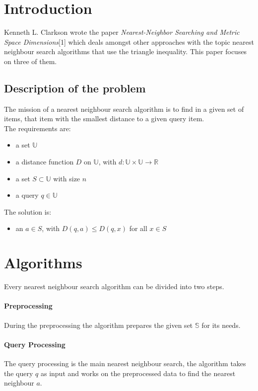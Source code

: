 \documentclass[runningheads,a4paper]{llncs}
\begin{document}
\tableofcontents
{}

\newpage
{}

\section{Introduction}

Kenneth L. Clarkson wrote the paper \textit{Nearest-Neighbor Searching and Metric Space Dimensions}[1] which deals
amongst other approaches with the topic nearest neighbour search algorithms that use the triangle inequality. This paper
focuses on three of them.

\subsection{Description of the problem}

The mission of a nearest neighbour search algorithm is to find in a given set of items, that item with the smallest
distance to a given query item.\\
The requirements are:
\begin{itemize}
	\item a set $\mathbb{U}$
	\item a distance function $D$ on $\mathbb{U}$, with $d: \mathbb{U} \times \mathbb{U} \to \mathbb{R}$
	\item a set $S \subset \mathbb{U}$ with size $n$
	\item a query $q \in \mathbb{U}$
\end{itemize}
The solution is:
\begin{itemize}
	\item an $a \in S$, with $D(q, a) \le D(q, x)$ for all $x \in S$
\end{itemize}

\section{Algorithms}

Every nearest neighbour search algorithm can be divided into two steps.
\paragraph{Preprocessing}
During the preprocessing the algorithm prepares the given set $\mathbb{S}$ for its needs.

\paragraph{Query Processing}
The query processing is the main nearest neighbour search, the algorithm takes the query $q$ as input and works on the
preprocessed data to find the nearest neighbour $a$.\\
\end{document}
